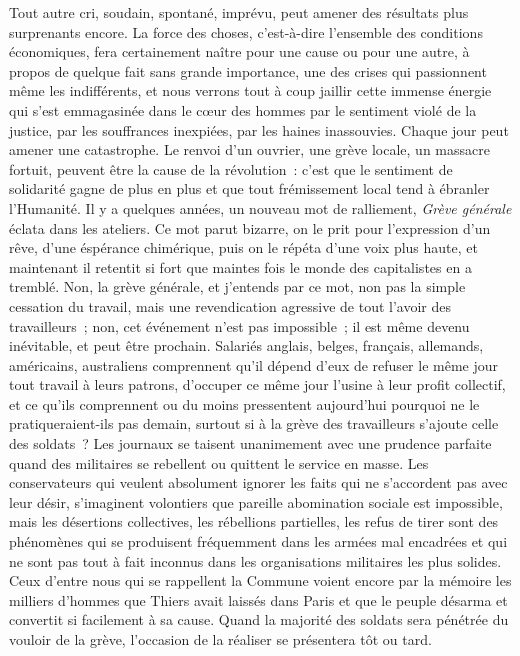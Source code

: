 \documentclass[french,twoside]{book} %
\begin{document}
Tout autre cri, soudain, spontané, imprévu, peut amener des résultats plus surprenants encore. La force des choses, c’est-à-dire l’ensemble des conditions économiques, fera certainement naître pour une cause ou pour une autre, à propos de quelque fait sans grande importance, une des crises qui passionnent même les indifférents, et nous verrons tout à coup jaillir cette immense énergie qui s’est emmagasinée dans le cœur des hommes par le sentiment violé de la justice, par les souffrances inexpiées, par les haines inassouvies.  Chaque jour peut amener une catastrophe. Le renvoi d’un ouvrier, une grève locale, un massacre fortuit, peuvent être la cause de la révolution : c’est que le sentiment de solidarité gagne de plus en plus et que tout frémissement local tend à ébranler l’Humanité. Il y a quelques années, un nouveau mot de ralliement, \emph{Grève générale} éclata dans les ateliers. Ce mot parut bizarre, on le prit pour l’expression d’un rêve, d’une éspérance chimérique, puis on le répéta d’une voix plus haute, et maintenant il retentit si fort que maintes fois le monde des capitalistes en a tremblé. Non, la grève générale, et j’entends par ce mot, non pas la simple cessation du travail, mais une revendication agressive de tout l’avoir des travailleurs ; non, cet  événement n’est pas impossible ; il est même devenu inévitable, et peut être prochain. Salariés anglais, belges, français, allemands, américains, australiens comprennent qu’il dépend d’eux de refuser le même jour tout travail à leurs patrons, d’occuper ce même jour l’usine à leur profit collectif, et ce qu’ils comprennent ou du moins pressentent aujourd’hui pourquoi ne le pratiqueraient-ils pas demain, surtout si à la grève des travailleurs s’ajoute celle des soldats ? Les journaux se taisent unanimement avec une prudence parfaite quand des militaires se rebellent ou quittent le service en masse. Les conservateurs qui veulent absolument ignorer les faits qui ne s’accordent pas avec leur désir, s’imaginent volontiers que pareille abomination  sociale est impossible, mais les désertions collectives, les rébellions partielles, les refus de tirer sont des phénomènes qui se produisent fréquemment dans les armées mal encadrées et qui ne sont pas tout à fait inconnus dans les organisations militaires les plus solides. Ceux d’entre nous qui se rappellent la Commune voient encore par la mémoire les milliers d’hommes que Thiers avait laissés dans Paris et que le peuple désarma et convertit si facilement à sa cause. Quand la majorité des soldats sera pénétrée du vouloir de la grève, l’occasion de la réaliser se présentera tôt ou tard.\par
\end{document}
